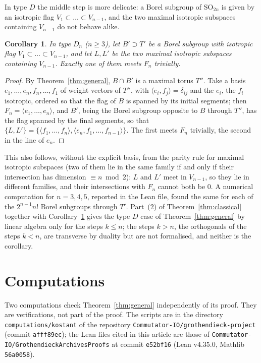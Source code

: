 \documentclass[11pt,a4paper]{amsart}
\newtheorem{corollary}[theorem]{Corollary}
\theoremstyle{definition}
\theoremstyle{remark}
\begin{document}
In type $D$ the middle step is more delicate: a Borel subgroup of $\mathrm{SO}_{2n}$ is given by an isotropic flag $V_1 \subset \dots \subset V_{n-1}$, and the two maximal isotropic subspaces containing $V_{n-1}$ do not behave alike.

\begin{corollary}\label{cor:Dmiddle}
In type $D_n$ ($n \geq 3$), let $B' \supset T'$ be a Borel subgroup with isotropic flag $V_1 \subset \dots \subset V_{n-1}$, and let $L, L'$ be the two maximal isotropic subspaces containing $V_{n-1}$. Exactly one of them meets $F_n$ trivially.
\end{corollary}
\begin{proof}
By Theorem~\ref{thm:general}, $B \cap B'$ is a maximal torus $T''$. Take a basis $e_1,\dots,e_n,f_n,\dots,f_1$ of weight vectors of $T''$, with $\langle e_i, f_j\rangle = \delta_{ij}$ and the $e_i$, the $f_i$ isotropic, ordered so that the flag of $B$ is spanned by its initial segments; then $F_n = \langle e_1,\dots,e_n\rangle$, and $B'$, being the Borel subgroup opposite to $B$ through $T''$, has the flag spanned by the final segments, so that $\{L, L'\} = \{\langle f_1,\dots,f_n\rangle, \langle e_n, f_1,\dots,f_{n-1}\rangle\}$. The first meets $F_n$ trivially, the second in the line of $e_n$.
\end{proof}

This also follows, without the explicit basis, from the parity rule for maximal isotropic subspaces (two of them lie in the same family if and only if their intersection has dimension $\equiv n \bmod 2$): $L$ and $L'$ meet in $V_{n-1}$, so they lie in different families, and their intersections with $F_n$ cannot both be $0$. A numerical computation for $n = 3, 4, 5$, reported in the Lean file, found the same for each of the $2^{n-1} n!$ Borel subgroups through $T'$. Part~(2) of Theorem~\ref{thm:classical} together with Corollary~\ref{cor:Dmiddle} gives the type $D$ case of Theorem~\ref{thm:general} by linear algebra only for the steps $k \le n$; the steps $k > n$, the orthogonals of the steps $k < n$, are transverse by duality but are not formalised, and neither is the corollary.

\section{Computations}\label{sec:checks}

Two computations check Theorem~\ref{thm:general} independently of its proof. They are verifications, not part of the proof. The scripts are in the directory \texttt{computations/kostant} of the repository \texttt{Commutator-IO/grothendieck-project} (commit \texttt{afff89ec}); the Lean files cited in this article are those of \texttt{Commutator-IO/GrothendieckArchivesProofs} at commit \texttt{e52bf16} (Lean v4.35.0, Mathlib \texttt{56a0058}).
\end{document}

